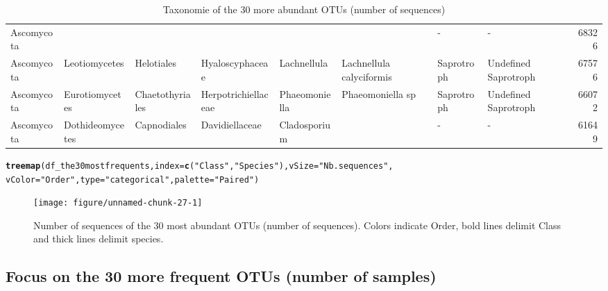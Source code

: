 \documentclass[12pt]{article}\usepackage[]{graphicx}\usepackage[]{color}
\makeatletter
\newcommand{\hlstr}[1]{\textcolor[rgb]{0.192,0.494,0.8}{#1}}%
\newcommand{\hlstd}[1]{\textcolor[rgb]{0.345,0.345,0.345}{#1}}%
\newcommand{\hlkwc}[1]{\textcolor[rgb]{0.333,0.667,0.333}{#1}}%
\newcommand{\hlkwd}[1]{\textcolor[rgb]{0.737,0.353,0.396}{\textbf{#1}}}%
\newenvironment{kframe}{%
 \def\at@end@of@kframe{}%
 \ifinner\ifhmode%
  \def\at@end@of@kframe{\end{minipage}}%
  \begin{minipage}{\columnwidth}%
 \fi\fi%
 \def\FrameCommand##1{\hskip\@totalleftmargin \hskip-\fboxsep
 \colorbox{shadecolor}{##1}\hskip-\fboxsep
     \hskip-\linewidth \hskip-\@totalleftmargin \hskip\columnwidth}%
 \MakeFramed {\advance\hsize-\width
   \@totalleftmargin\z@ \linewidth\hsize
   \@setminipage}}%
 {\par\unskip\endMakeFramed%
 \at@end@of@kframe}
\newenvironment{knitrout}{}{} %
\numberwithin{figure}{section}
\makeatother
\begin{document}
\begin{landscape}
\begin{table}[ht]
\begin{tabular}{llllllllr}
  Ascomycota &  &  &  &  &  & - & - & 68326 \\ 
  Ascomycota & Leotiomycetes & Helotiales & Hyaloscyphaceae & Lachnellula & Lachnellula calyciformis & Saprotroph & Undefined Saprotroph & 67576 \\ 
  Ascomycota & Eurotiomycetes & Chaetothyriales & Herpotrichiellaceae & Phaeomoniella & Phaeomoniella sp & Saprotroph & Undefined Saprotroph & 66072 \\ 
  Ascomycota & Dothideomycetes & Capnodiales & Davidiellaceae & Cladosporium &  & - & - & 61649 \\ 
   \hline
\end{tabular}
\endgroup
\caption{Taxonomie of the 30 more
             abundant OTUs (number of sequences)} 
\end{table}

\end{landscape}

\begin{knitrout}\small
{}\color{fgcolor}\begin{kframe}
\begin{alltt}
\hlkwd{treemap}\hlstd{(df_the30mostfrequents,} \hlkwc{index} \hlstd{=} \hlkwd{c}\hlstd{(}\hlstr{"Class"}\hlstd{,} \hlstr{"Species"}\hlstd{),} \hlkwc{vSize} \hlstd{=} \hlstr{"Nb.sequences"}\hlstd{,}
        \hlkwc{vColor} \hlstd{=} \hlstr{"Order"}\hlstd{,} \hlkwc{type} \hlstd{=} \hlstr{"categorical"}\hlstd{,} \hlkwc{palette} \hlstd{=} \hlstr{"Paired"}\hlstd{)}
\end{alltt}
\end{kframe}\begin{figure}

{\centering \texttt{[image: figure/unnamed-chunk-27-1]} 

}

\caption[Number of sequences of the 30 most abundant OTUs (number of sequences)]{Number of sequences of the 30 most abundant OTUs (number of sequences). Colors indicate Order, bold lines delimit Class and thick lines delimit species.}\label{fig:unnamed-chunk-27}
\end{figure}


\end{knitrout}

  \subsection{Focus on the 30 more frequent OTUs (number of samples)}
\end{document}
